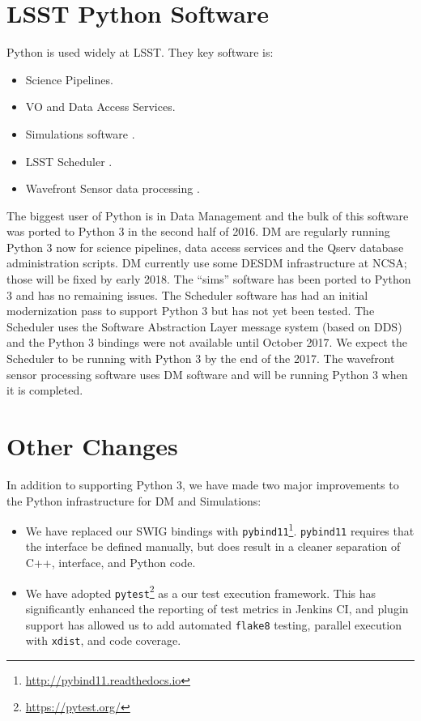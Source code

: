 \documentclass[11pt,twoside]{article}
\begin{document}
\section{LSST Python Software}

Python is used widely at LSST. They key software is:
\begin{itemize}
\item Science Pipelines.
\item VO and Data Access Services.
\item Simulations software \citep{2014SPIE.9150E..14C}.
\item LSST Scheduler \citep{2016SPIE.9910E..13D}.
\item Wavefront Sensor data processing \citep{2016SPIE.9906E..3BT}.
\end{itemize}
The biggest user of Python is in Data Management \citep[DM;][]{O3-1_adassxxv} and the bulk of this software was ported to Python 3 in the second half of 2016.
DM are regularly running Python 3 now for science pipelines, data access services and the Qserv database administration scripts.
DM currently use some DESDM infrastructure at NCSA; those will be fixed by early 2018.
The ``sims'' software has been ported to Python 3 and has no remaining issues.
The Scheduler software has had an initial modernization pass to support Python 3 but has not yet been tested.
The Scheduler uses the Software Abstraction Layer \citep[SAL;][]{2016SPIE.9906E..5CM} message system (based on DDS) \citep{2016SPIE.9911E..25R} and the Python 3 bindings were not available until October 2017.
We expect the Scheduler to be running with Python 3 by the end of the 2017.
The wavefront sensor processing software uses DM software and will be running Python 3 when it is completed.

\section{Other Changes}


In addition to supporting Python 3, we have made two major improvements to the Python infrastructure for DM and Simulations:
\begin{itemize}
\item We have replaced our SWIG bindings \citep{beazley2003automated} with \texttt{pybind11}\footnote{\url{http://pybind11.readthedocs.io}}.
      \texttt{pybind11} requires that the interface be defined manually, but does result in a cleaner separation of C++, interface, and Python code.
\item We have adopted \texttt{pytest}\footnote{\url{https://pytest.org/}} as a our test execution framework.
      This has significantly enhanced the reporting of test metrics in Jenkins CI, and plugin support has allowed us to add automated \texttt{flake8} testing, parallel execution with \texttt{xdist}, and code coverage.
\end{itemize}
\end{document}
